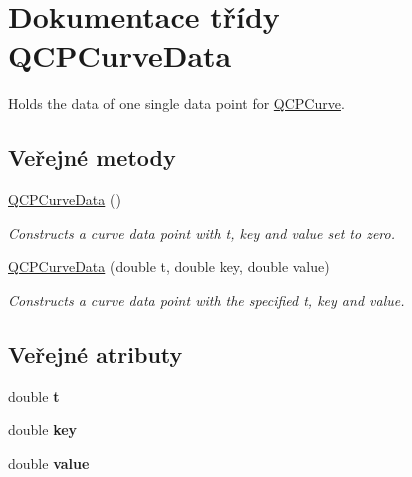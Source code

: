 \hypertarget{classQCPCurveData}{}\section{Dokumentace třídy Q\+C\+P\+Curve\+Data}
\label{classQCPCurveData}


Holds the data of one single data point for \hyperlink{classQCPCurve}{Q\+C\+P\+Curve}.  


\subsection*{Veřejné metody}
\begin{DoxyCompactItemize}
\item 
\hypertarget{classQCPCurveData_a48252779b5198a509d99c69ae223fbf8}{}\hyperlink{classQCPCurveData_a48252779b5198a509d99c69ae223fbf8}{Q\+C\+P\+Curve\+Data} ()\label{classQCPCurveData_a48252779b5198a509d99c69ae223fbf8}

\begin{DoxyCompactList}\small\item\em Constructs a curve data point with t, key and value set to zero. \end{DoxyCompactList}\item 
\hypertarget{classQCPCurveData_a3586be0cc6f8db15bcdd0c0d03b0c173}{}\hyperlink{classQCPCurveData_a3586be0cc6f8db15bcdd0c0d03b0c173}{Q\+C\+P\+Curve\+Data} (double t, double key, double value)\label{classQCPCurveData_a3586be0cc6f8db15bcdd0c0d03b0c173}

\begin{DoxyCompactList}\small\item\em Constructs a curve data point with the specified {\itshape t}, {\itshape key} and {\itshape value}. \end{DoxyCompactList}\end{DoxyCompactItemize}
\subsection*{Veřejné atributy}
\begin{DoxyCompactItemize}
\item 
\hypertarget{classQCPCurveData_aecc395525be28e9178a088793beb3ff3}{}double {\bfseries t}\label{classQCPCurveData_aecc395525be28e9178a088793beb3ff3}

\item 
\hypertarget{classQCPCurveData_a8a4ec5f2b9a396149fd842e309701bd4}{}double {\bfseries key}\label{classQCPCurveData_a8a4ec5f2b9a396149fd842e309701bd4}

\item 
\hypertarget{classQCPCurveData_a72b39b8e1dbf7b45382ebd48419b6828}{}double {\bfseries value}\label{classQCPCurveData_a72b39b8e1dbf7b45382ebd48419b6828}

\end{DoxyCompactItemize}



